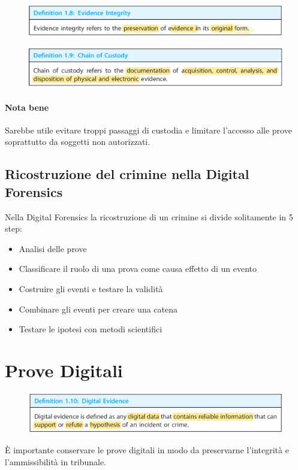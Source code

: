 \begin{figure}[h!]
    \includegraphics[width=\textwidth]{Capitolo 1/Figure/evidence-integrity.png}
\end{figure}

\begin{figure}[h!]
    \includegraphics[width=\textwidth]{Capitolo 1/Figure/chain-of-custody.png}
\end{figure}

\paragraph{Nota bene}
Sarebbe utile evitare troppi passaggi di custodia e limitare l'accesso alle prove soprattutto da soggetti non autorizzati.

\subsection{Ricostruzione del crimine nella Digital Forensics}
Nella Digital Forensics la ricostruzione di un crimine si divide solitamente in 5 step:
\begin{itemize}
    \item Analisi delle prove
    \item Classificare il ruolo di una prova come causa effetto di un evento
    \item Costruire gli eventi e testare la validità
    \item Combinare gli eventi per creare una catena
    \item Testare le ipotesi con metodi scientifici
\end{itemize}


\section{Prove Digitali}
\begin{figure}[h!]
    \includegraphics[width=\textwidth]{Capitolo 1/Figure/digital-evidence.png}
\end{figure}
È importante conservare le prove digitali in modo da preservarne l'integrità e l'ammissibilità in tribunale.

